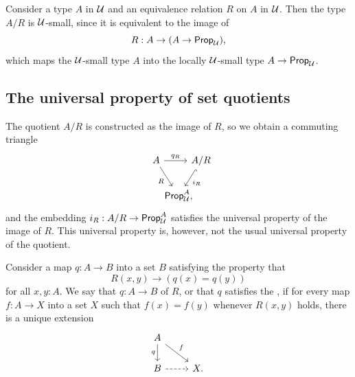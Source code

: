 \begin{eg}
  Consider a type $A$ in $\mathcal{U}$ and an equivalence relation $R$ on $A$ in $\mathcal{U}$. Then the type $A/R$ is $\mathcal{U}$-small, since it is equivalent to the image of
  \begin{equation*}
    R:A\to (A\to\mathsf{Prop}_{\mathcal{U}}),
  \end{equation*}
  which maps the $\mathcal{U}$-small type $A$ into the locally $\mathcal{U}$-small type $A\to\mathsf{Prop}_{\mathcal{U}}$.
\end{eg}

\subsection{The universal property of set quotients}

The quotient $A/R$ is constructed as the image of $R$, so we obtain a commuting triangle
\begin{equation*}
  \begin{tikzcd}[column sep=-1em]
    A \arrow[rr,"q_R"] \arrow[dr,swap,"R"] & & A/R \arrow[dl,hook,"i_R"] \\
    \phantom{A/R} & \prop_\UU^A,
  \end{tikzcd}
\end{equation*}
and the embedding $i_R:A/R\to\mathsf{Prop}_{\mathcal{U}}^A$ satisfies the universal property of the image of $R$. This universal property is, however, not the usual universal property of the quotient.

\begin{defn}
  Consider a map $q:A\to B$ into a set $B$ satisfying the property that
  \begin{equation*}
    R(x,y)\to (q(x)=q(y))
  \end{equation*}
  for all $x,y:A$. We say that $q:A\to B$  of $R$, or that $q$ satisfies the , if for every map $f:A\to X$ into a set $X$ such that $f(x)=f(y)$ whenever $R(x,y)$ holds, there is a unique extension
  \begin{equation*}
    \begin{tikzcd}
      A \arrow[d,swap,"q"] \arrow[dr,"f"] \\
      B \arrow[r,dashed] & X.
    \end{tikzcd}
  \end{equation*}
\end{defn}


